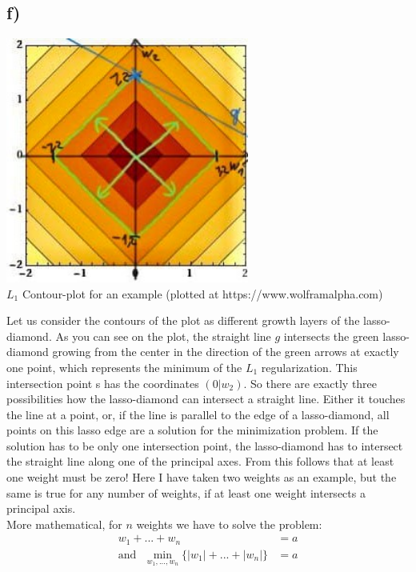 \documentclass[a4paper]{article}
\begin{document}
    \subsection*{f)}
        \begin{center}
            \includegraphics[width=80mm]{Assignment 7/L1(3).jpg}\\
            \caption{$L_1$ Contour-plot for an example (plotted at https://www.wolframalpha.com)}
        \end{center}
        Let us consider the contours of the plot as different growth layers of the lasso-diamond.
        As you can see on the plot, the straight line $g$ intersects the green lasso-diamond growing from the center in the direction of the green arrows at exactly one point, which represents the minimum of the $L_1$ regularization. 
        This intersection point s has the coordinates $(0|w_2)$.
        So there are exactly three possibilities how the lasso-diamond can intersect a straight line.
        Either it touches the line at a point, or, if the line is parallel to the edge of a lasso-diamond, all points on this lasso edge are a solution for the minimization problem.
        If the solution has to be only one intersection point, the lasso-diamond has to intersect the straight line along one of the principal axes.
        From this follows that at least one weight must be zero!
        Here I have taken two weights as an example, but the same is true for any number of weights, if at least one weight intersects a principal axis.\\
        More mathematical, for $n$ weights we have to solve the problem:
        \begin{align}
            w_1 + ... + w_n &= a\\
            \text{and}\ \ \ \min_{w_1,...,w_n}\{|w_1| + ... + |w_n|\} &= a
        \end{align}
\end{document}
